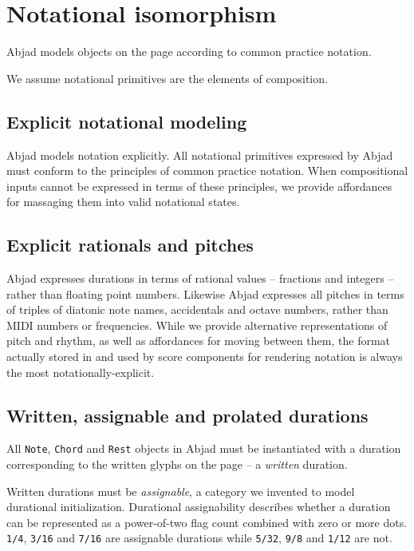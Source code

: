 \section{Notational isomorphism}\label{sec:notational_isomorphism}

Abjad models objects on the page according to common practice notation.

We assume notational primitives are the elements of composition.

\subsection{Explicit notational modeling}

Abjad models notation explicitly. All notational primitives expressed by Abjad
must conform to the principles of common practice notation. When compositional
inputs cannot be expressed in terms of these principles, we provide affordances
for massaging them into valid notational states.

\subsection{Explicit rationals and pitches}

Abjad expresses durations in terms of rational values -- fractions and integers
-- rather than floating point numbers. Likewise Abjad expresses all pitches in
terms of triples of diatonic note names, accidentals and octave numbers, rather
than MIDI numbers or frequencies. While we provide alternative representations
of pitch and rhythm, as well as affordances for moving between them, the format
actually stored in and used by score components for rendering notation is
always the most notationally-explicit.

\subsection{Written, assignable and prolated durations}

All \texttt{Note}, \texttt{Chord} and \texttt{Rest} objects in Abjad must be
instantiated with a duration corresponding to the written glyphs on the page --
a \emph{written} duration.

Written durations must be \emph{assignable}, a category we invented to model
durational initialization. Durational assignability describes whether a
duration can be represented as a power-of-two flag count combined with zero or
more dots. \texttt{1/4}, \texttt{3/16} and \texttt{7/16} are assignable
durations while \texttt{5/32}, \texttt{9/8} and \texttt{1/12} are not.

